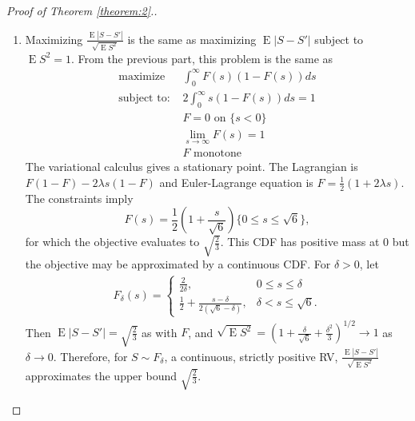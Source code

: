 \documentclass[12pt]{article}
\newcommand{\s}{S}
\DeclareMathOperator{\E}{E}
\begin{document}
\begin{proof}[Proof of Theorem \ref{theorem:2}.]
\begin{enumerate}
    \item Maximizing $\frac{\E|\s-\s'|}{\sqrt{\E\s^2}}$ is the same as maximizing $\E|\s-\s'|$ subject to $\E\s^2=1$. From the previous part, this problem is the same as
      \begin{align}
        \text{maximize } &\int_0^\infty F(s)(1-F(s))ds\\
        \text{subject to: } & 2\int_0^\infty s(1-F(s))ds=1\\
                         & F=0 \text{ on } \{s<0\}\\
                         & \lim_{s\to\infty} F(s)=1\\
                                 & F \text{ monotone }
      \end{align}
      The variational calculus gives a stationary point. The Lagrangian is $F(1-F)-2\lambda s(1-F)$ and Euler-Lagrange equation is $ F=\frac{1}{2}(1+2\lambda s).$ The constraints imply
      $$
      F(s) = \frac{1}{2}\left(1+\frac{s}{\sqrt{6}}\right)\{0\le s\le \sqrt{6}\},
      $$
      for which the objective evaluates to $\sqrt{\frac{2}{3}}$. This
      CDF has positive mass at $0$ but the objective may be
      approximated by a continuous CDF. For $\delta>0$, let
      \begin{align}
        F_\delta(s) = \begin{cases}
          \frac{2}{2\delta}, & 0\le s \le \delta\\
          \frac{1}{2} + \frac{s-\delta}{2(\sqrt{6}-\delta)}, & \delta<s\le\sqrt{6}.
        \end{cases}
      \end{align}
      Then $\E|\s-\s'|=\sqrt{\frac{2}{3}}$ as with $F$, and $\sqrt{\E\s^2}=\left(1+\frac{\delta}{\sqrt{6}}+\frac{\delta^2}{3}\right)^{1/2}\to 1$ as $\delta\to 0$. Therefore, for $\s\sim F_\delta$, a continuous, strictly positive RV, $\frac{\E|\s-\s'|}{\sqrt{\E\s^2}}$ approximates the upper bound $\sqrt{\frac{2}{3}}$.
    \end{enumerate}
  \end{proof}
\end{document}
